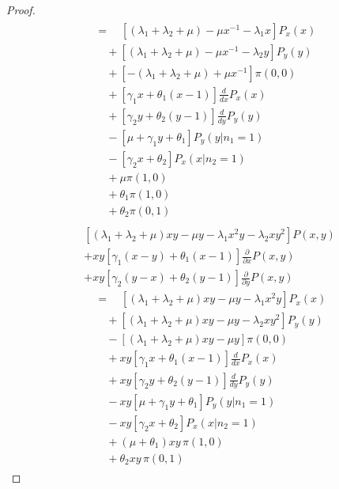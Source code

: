 \begin{proof}
\begin{align}
\begin{split}
            & \quad = \quad \left[ (\lambda_1 + \lambda_2 + \mu) - \mu x^{-1} - \lambda_1 x \right] P_x(x) \\
            & \quad \quad + \left[ (\lambda_1 + \lambda_2 + \mu) - \mu x^{-1} - \lambda_2 y \right] P_y(y) \\
            & \quad \quad + \left[ -(\lambda_1 + \lambda_2 + \mu) + \mu x^{-1} \right] \pi(0,0) \\
            & \quad \quad + \left[ \gamma_1 x + \theta_1(x-1) \right] \frac{d}{dx} P_x(x) \\
            & \quad \quad + \left[ \gamma_2 y + \theta_2(y-1) \right] \frac{d}{dy} P_y(y) \\
            & \quad \quad - \left[ \mu + \gamma_1 y + \theta_1 \right] P_y(y | n_1=1) \\
            & \quad \quad - \left[ \gamma_2 x + \theta_2 \right] P_x(x | n_2=1) \\
            & \quad \quad + \mu \pi(1,0) \\
            & \quad \quad + \theta_1 \pi(1,0) \\
            & \quad \quad + \theta_2 \pi(0,1)
        \end{split} \nonumber \\
        \begin{split}
            & \left[ (\lambda_1+\lambda_2+\mu)xy - \mu y - \lambda_1 x^2 y - \lambda_2 x y^2 \right] P(x,y) \\
            & + xy \left[ \gamma_1(x-y) + \theta_1(x-1) \right] \frac{\partial}{\partial x} P(x,y) \\
            & + xy \left[ \gamma_2(y-x) + \theta_2(y-1) \right] \frac{\partial}{\partial y} P(x,y) \\
            & \quad = \quad \left[ (\lambda_1 + \lambda_2 + \mu)xy - \mu y - \lambda_1 x^2 y \right] P_x(x) \\
            & \quad \quad + \left[ (\lambda_1 + \lambda_2 + \mu)xy - \mu y - \lambda_2 x y^2 \right] P_y(y) \\
            & \quad \quad - \left[ (\lambda_1 + \lambda_2 + \mu)xy - \mu y \right] \pi(0,0) \\
            & \quad \quad + xy \left[ \gamma_1 x + \theta_1(x-1) \right] \frac{d}{dx} P_x(x) \\
            & \quad \quad + xy \left[ \gamma_2 y + \theta_2(y-1) \right] \frac{d}{dy} P_y(y) \\
            & \quad \quad - xy \left[ \mu + \gamma_1 y + \theta_1 \right] P_y(y | n_1=1) \\
            & \quad \quad - xy \left[ \gamma_2 x + \theta_2 \right] P_x(x | n_2=1) \\
            & \quad \quad + (\mu + \theta_1) xy \, \pi(1,0) \\
            & \quad \quad + \theta_2 xy \, \pi(0,1)
        \end{split} \label{eq:gen:transform_interior}
    \end{align}
    

\end{proof}
